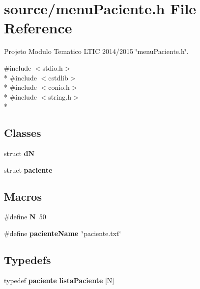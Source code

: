 \section{source/menu\+Paciente.h File Reference}
\label{menu_paciente_8h}


Projeto Modulo Tematico L\+T\+I\+C 2014/2015 \char`\"{}menu\+Paciente.\+h\char`\"{}.  


{\ttfamily \#include $<$stdio.\+h$>$}\\*
{\ttfamily \#include $<$cstdlib$>$}\\*
{\ttfamily \#include $<$conio.\+h$>$}\\*
{\ttfamily \#include $<$string.\+h$>$}\\*
\subsection*{Classes}
\begin{DoxyCompactItemize}
\item 
struct {\bf d\+N}
\item 
struct {\bf paciente}
\end{DoxyCompactItemize}
\subsection*{Macros}
\begin{DoxyCompactItemize}
\item 
\#define {\bfseries N}~50\label{menu_paciente_8h_a0240ac851181b84ac374872dc5434ee4}

\item 
\#define {\bfseries paciente\+Name}~\char`\"{}paciente.\+txt\char`\"{}\label{menu_paciente_8h_a95c77d42148886e0c4dc768c772f092b}

\end{DoxyCompactItemize}
\subsection*{Typedefs}
\begin{DoxyCompactItemize}
\item 
typedef {\bf paciente} {\bf lista\+Paciente} [N]
\end{DoxyCompactItemize}
